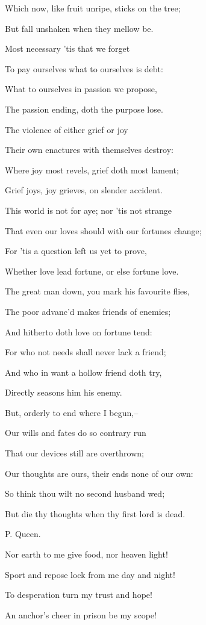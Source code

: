 \documentclass[12pt]{book}
\begin{document}
Which now, like fruit unripe, sticks on the tree;

But fall unshaken when they mellow be.

Most necessary 'tis that we forget

To pay ourselves what to ourselves is debt:

What to ourselves in passion we propose,

The passion ending, doth the purpose lose.

The violence of either grief or joy

Their own enactures with themselves destroy:

Where joy most revels, grief doth most lament;

Grief joys, joy grieves, on slender accident.

This world is not for aye; nor 'tis not strange

That even our loves should with our fortunes change;

For 'tis a question left us yet to prove,

Whether love lead fortune, or else fortune love.

The great man down, you mark his favourite flies,

The poor advanc'd makes friends of enemies;

And hitherto doth love on fortune tend:

For who not needs shall never lack a friend;

And who in want a hollow friend doth try,

Directly seasons him his enemy.

But, orderly to end where I begun,--

Our wills and fates do so contrary run

That our devices still are overthrown;

Our thoughts are ours, their ends none of our own:

So think thou wilt no second husband wed;

But die thy thoughts when thy first lord is dead.



P. Queen.

Nor earth to me give food, nor heaven light!

Sport and repose lock from me day and night!

To desperation turn my trust and hope!

An anchor's cheer in prison be my scope!
\end{document}
